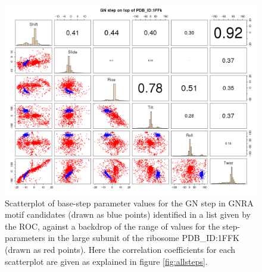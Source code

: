 \begin{figure}
\centering 
\includegraphics[angle=90, scale=0.5]{Chapter5/GNRAin1ffk.png}
\caption{Scatterplot of base-step parameter  values for the GN step in
  GNRA motif  candidates (drawn as  blue points) identified in  a list
  given by the ROC, against a  backdrop of the range of values for the
  step-parameters in  the large  subunit of the  ribosome PDB\_ID:1FFK
  (drawn as  red points).  Here the correlation  coefficients for each
  scatterplot are given as explained in figure \ref{fig:allsteps}.}
\label{fig:scattergnra}
\end{figure}
%
%




